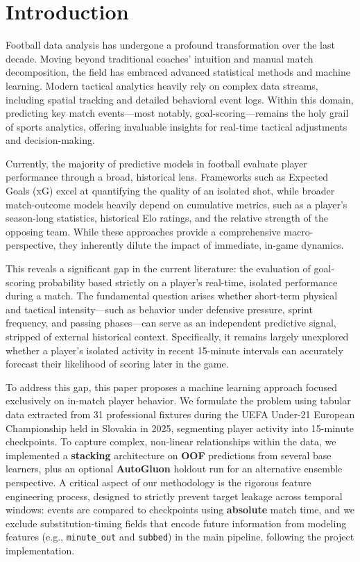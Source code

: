 \documentclass[11pt, a4paper]{article}
\begin{document}
\section{Introduction}

Football data analysis has undergone a profound transformation over the last decade. Moving beyond traditional coaches' intuition and manual match decomposition, the field has embraced advanced statistical methods and machine learning. Modern tactical analytics heavily rely on complex data streams, including spatial tracking and detailed behavioral event logs. Within this domain, predicting key match events—most notably, goal-scoring—remains the holy grail of sports analytics, offering invaluable insights for real-time tactical adjustments and decision-making.

Currently, the majority of predictive models in football evaluate player performance through a broad, historical lens. Frameworks such as Expected Goals (xG) excel at quantifying the quality of an isolated shot, while broader match-outcome models heavily depend on cumulative metrics, such as a player's season-long statistics, historical Elo ratings, and the relative strength of the opposing team. While these approaches provide a comprehensive macro-perspective, they inherently dilute the impact of immediate, in-game dynamics. 

This reveals a significant gap in the current literature: the evaluation of goal-scoring probability based strictly on a player's real-time, isolated performance during a match. The fundamental question arises whether short-term physical and tactical intensity—such as behavior under defensive pressure, sprint frequency, and passing phases—can serve as an independent predictive signal, stripped of external historical context. Specifically, it remains largely unexplored whether a player's isolated activity in recent 15-minute intervals can accurately forecast their likelihood of scoring later in the game.

To address this gap, this paper proposes a machine learning approach focused exclusively on in-match player behavior. We formulate the problem using tabular data extracted from 31 professional fixtures during the UEFA Under-21 European Championship held in Slovakia in 2025, segmenting player activity into 15-minute checkpoints. To capture complex, non-linear relationships within the data, we implemented a \textbf{stacking} architecture on \textbf{OOF} predictions from several base learners, plus an optional \textbf{AutoGluon} holdout run for an alternative ensemble perspective. A critical aspect of our methodology is the rigorous feature engineering process, designed to strictly prevent target leakage across temporal windows: events are compared to checkpoints using \textbf{absolute} match time, and we exclude substitution-timing fields that encode future information from modeling features (e.g., \texttt{minute\_out} and \texttt{subbed}) in the main pipeline, following the project implementation.
\end{document}
